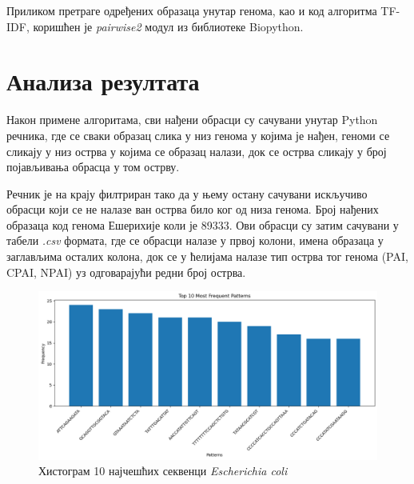 \documentclass[12pt]{article}
\begin{document}
Приликом претраге одређених образаца унутар генома, као и код алгоритма TF-IDF, коришћен је \textit{pairwise2} модул из библиотеке Biopython.

\section{Анализа резултата}

Након примене алгоритама, сви нађени обрасци су сачувани унутар Python речника, где се сваки образац слика у низ генома у којима је нађен, геноми се сликају у низ острва у којима се образац налази, док се острва сликају у број појављивања обрасца у том острву.

Речник је на крају филтриран тако да у њему остану сачувани искључиво обрасци који се не налазе ван острва било ког од низа генома. Број нађених образаца код генома Ешерихије коли је 89333. Ови обрасци су затим сачувани у табели \textit{.csv} формата, где се обрасци налазе у првој колони, имена образаца у заглављима осталих колона, док се у ћелијама налазе тип острва тог генома (PAI, CPAI, NPAI) уз одговарајући редни број острва.

\begin{figure}[htbp]
    \centering
    \includegraphics[width=\linewidth]{images/top_10_hist.png}
    \caption{Хистограм 10 најчешћих секвенци \textit{Escherichia coli}}
    \label{fig:top10hist}
\end{figure}
\end{document}
